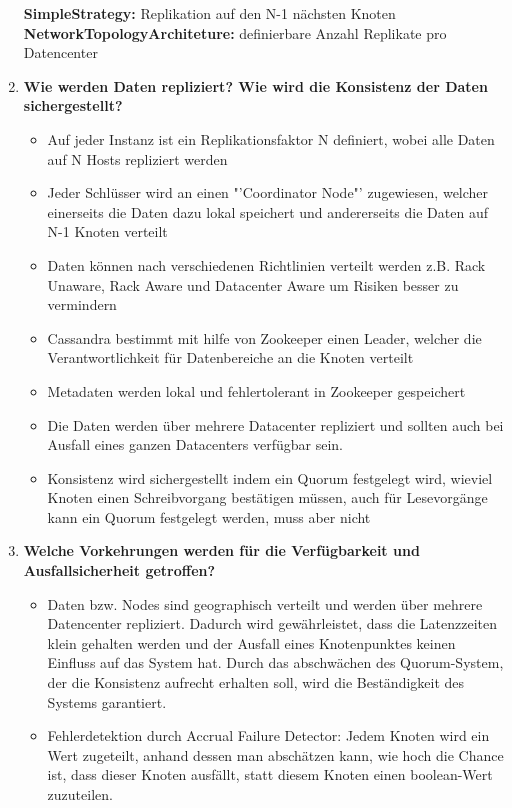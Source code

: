 \documentclass[a4paper,10pt,titlepage=false]{scrreprt}
\begin{document}
\begin{enumerate}
\textbf{SimpleStrategy:} Replikation auf den N-1 nächsten Knoten\\
\textbf{NetworkTopologyArchiteture:} definierbare Anzahl Replikate pro Datencenter\\
\item \textbf{ Wie werden Daten repliziert? Wie wird die Konsistenz der Daten sichergestellt?}\\
\begin{itemize}
  \item Auf jeder Instanz ist ein Replikationsfaktor N definiert, wobei alle Daten auf N Hosts repliziert werden
\item Jeder Schlüsser wird an einen "'Coordinator Node"' zugewiesen, welcher einerseits die Daten dazu lokal speichert und andererseits die Daten auf N-1 Knoten verteilt
\item Daten können nach verschiedenen Richtlinien verteilt werden z.B. Rack Unaware, Rack Aware und Datacenter Aware um Risiken besser zu vermindern
\item Cassandra bestimmt mit hilfe von Zookeeper einen Leader, welcher die Verantwortlichkeit für Datenbereiche an die Knoten verteilt
\item Metadaten werden lokal und fehlertolerant in Zookeeper gespeichert
\item Die Daten werden über mehrere Datacenter repliziert und sollten auch bei Ausfall eines ganzen Datacenters verfügbar sein.
\item Konsistenz wird sichergestellt indem ein Quorum festgelegt wird, wieviel Knoten einen Schreibvorgang bestätigen müssen, auch für Lesevorgänge kann ein Quorum festgelegt werden, muss aber nicht
\end{itemize}
\item \textbf{Welche Vorkehrungen werden für die Verfügbarkeit und Ausfallsicherheit getroffen?} \\
\begin{itemize}
  \item Daten bzw. Nodes sind geographisch verteilt und werden über mehrere Datencenter repliziert. Dadurch wird gewährleistet, dass die Latenzzeiten klein gehalten werden und der Ausfall eines Knotenpunktes keinen Einfluss auf das System hat. Durch das abschwächen des Quorum-System, der die Konsistenz aufrecht erhalten soll, wird die Beständigkeit des Systems garantiert.
\item Fehlerdetektion durch Accrual Failure Detector: Jedem Knoten wird ein Wert zugeteilt, anhand dessen man abschätzen kann, wie hoch die Chance ist, dass dieser Knoten ausfällt, statt diesem Knoten einen boolean-Wert zuzuteilen.

\end{itemize}
\end{enumerate}
\end{document}
